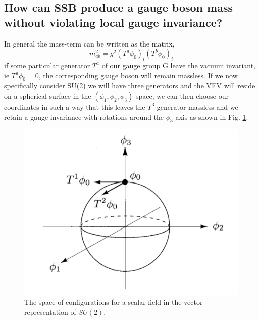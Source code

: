 \documentclass[paper=a4, fontsize=11pt]{scrartcl} %
\numberwithin{equation}{section} %
\numberwithin{figure}{section} %
\numberwithin{table}{section} %
\begin{document}
\subsection{How can SSB produce a gauge boson mass without violating local gauge invariance?}
In general the mass-term can be written as the matrix,
\begin{equation}
m^2_{ab} = g^2(T^a\phi_0)_i(T^b \phi_0)_i
\end{equation}
if some particular generator $T^a$ of our gauge group G leave the vacuum invariant, ie $T^a\phi_0 = 0$, the corresponding gauge boson will remain massless.
If we now specifically consider SU(2) we will have three generators and the VEV will reside on a spherical surface in the $(\phi_1, \phi_2, \phi_3)$-space, we can then choose our coordinates in such a way that this leaves the $T^3$ generator massless and we retain a gauge invariance with rotations around the $\phi_3$-axis as shown in Fig. \ref{fig:SSB_SU2}.

\begin{figure}[hbtp]
\centering
\includegraphics[width=\textwidth]{SSB_SU2.png}
\caption{The space of configurations for a scalar field in the vector representation of $SU(2)$.}
\label{fig:SSB_SU2}
\end{figure}
\end{document}

